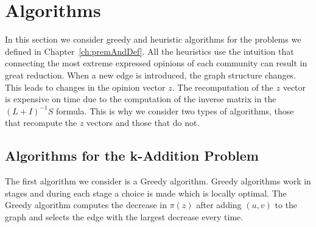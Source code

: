 \chapter{Algorithms}
\label{ch:algorithms}


In this section we  consider greedy and heuristic algorithms for the problems we defined in Chapter~\ref{ch:premAndDef}. All the heuristics use the intuition that connecting the most extreme expressed opinions of each community can result in great reduction. 
When a new edge is introduced, the graph structure changes. This leads to changes in the opinion vector $z$.
The recomputation of the $z$ vector is expensive on time due to the computation of the inverse matrix in the $(L+I)^{-1}S$ formula.
This is why we consider two types of algorithms, those that recompute the $z$ vectors and those that do not.


\section{Algorithms for the k-Addition Problem}
\label{sec:recomputeAlgos}

The first algorithm we consider is a Greedy algorithm. Greedy algorithms work in stages and during each stage a choice is made which is locally optimal.
The Greedy algorithm computes the decrease in $\pi(z)$ after adding $(u,v)$ to the graph and selects the edge with the largest decrease every time.
\clearpage

